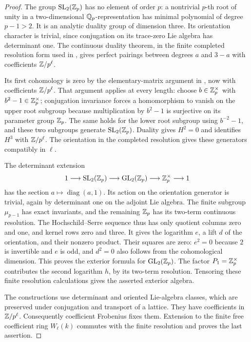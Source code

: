 \begin{proof}
The group \(\operatorname{SL}_2(\mathbb Z_p)\) has no element of order \(p\):
a nontrivial \(p\)-th root of unity in a two-dimensional
\(\mathbb Q_p\)-representation has minimal polynomial of degree
\(p-1>2\).  It is an analytic duality group of dimension three.
Its orientation character is trivial, since conjugation on
its trace-zero Lie algebra has determinant one.
The continuous duality theorem, in the finite completed
resolution form used in , gives perfect
pairings between degrees \(a\) and \(3-a\) with coefficients
\(\mathbb Z/p^\ell\).

Its first cohomology is zero by the elementary-matrix argument in
, now with coefficients \(\mathbb Z/p^\ell\).
That argument applies at every length: choose
\(b\in\mathbb Z_p^\times\) with \(b^2-1\in\mathbb Z_p^\times\);
conjugation invariance forces a homomorphism to vanish on the upper
root subgroup because multiplication by \(b^2-1\) is surjective
on its parameter group \(\mathbb Z_p\). The same holds for the lower
root subgroup using \(b^{-2}-1\), and these two subgroups generate
\(\operatorname{SL}_2(\mathbb Z_p)\).
Duality gives \(H^2=0\) and identifies \(H^3\) with
\(\mathbb Z/p^\ell\).  The orientation in the completed resolution
gives these generators compatibly in \(\ell\).

The determinant extension
\[
 1\longrightarrow\operatorname{SL}_2(\mathbb Z_p)\longrightarrow\operatorname{GL}_2(\mathbb Z_p)
   \longrightarrow\mathbb Z_p^\times\longrightarrow1
\]
has the section \(a\mapsto\operatorname{diag}(a,1)\).
Its action on the orientation generator is trivial, again
by determinant one on the adjoint Lie algebra.
The finite subgroup \(\mu_{p-1}\) has exact invariants,
and the remaining \(\mathbb Z_p\) has its two-term continuous
resolution.  The Hochschild--Serre sequence thus has only
quotient columns zero and one, and kernel rows zero and three.
It gives the logarithm \(e\), a lift \(d\) of the orientation,
and their nonzero product.  Their squares are zero:
\(e^2=0\) because \(2\) is invertible and \(e\) is odd,
and \(d^2=0\) also follows from the cohomological dimension.
This proves the exterior formula for \(\operatorname{GL}_2(\mathbb Z_p)\).
The factor \(P_1=\mathbb Z_p^\times\) contributes the second logarithm
\(h\), by its two-term resolution.  Tensoring these finite
resolution calculations gives the asserted exterior algebra.

The constructions use determinant and oriented Lie-algebra
classes, which are preserved under conjugation and transport
of a lattice.  They have coefficients in \(\mathbb Z/p^\ell\).
Consequently coefficient Frobenius fixes them.  Extension
to the finite free coefficient ring \(W_\ell(k)\) commutes
with the finite resolution and proves the last assertion.
\end{proof}


